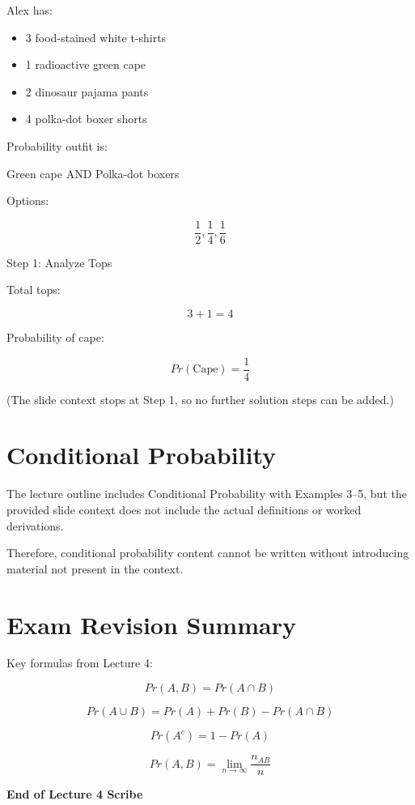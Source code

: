 \documentclass[12pt]{article}
\begin{document}
Alex has:

\begin{itemize}
    \item 3 food-stained white t-shirts
    \item 1 radioactive green cape
    \item 2 dinosaur pajama pants
    \item 4 polka-dot boxer shorts
\end{itemize}

Probability outfit is:

Green cape AND Polka-dot boxers

Options:

\[
\frac{1}{2}, \frac{1}{4}, \frac{1}{6}
\]

Step 1: Analyze Tops

Total tops:

\[
3 + 1 = 4
\]

Probability of cape:

\[
Pr(\text{Cape}) = \frac{1}{4}
\]

(The slide context stops at Step 1, so no further solution steps can be added.)

\section{Conditional Probability}

The lecture outline includes Conditional Probability with Examples 3--5, but the
provided slide context does not include the actual definitions or worked derivations.

Therefore, conditional probability content cannot be written without introducing
material not present in the context.

\section{Exam Revision Summary}

Key formulas from Lecture 4:

\[
Pr(A,B) = Pr(A \cap B)
\]

\[
Pr(A \cup B) = Pr(A) + Pr(B) - Pr(A \cap B)
\]

\[
Pr(A^c) = 1 - Pr(A)
\]

\[
Pr(A,B) = \lim_{n\to\infty} \frac{n_{AB}}{n}
\]

\bigskip

\textbf{End of Lecture 4 Scribe}
\end{document}
